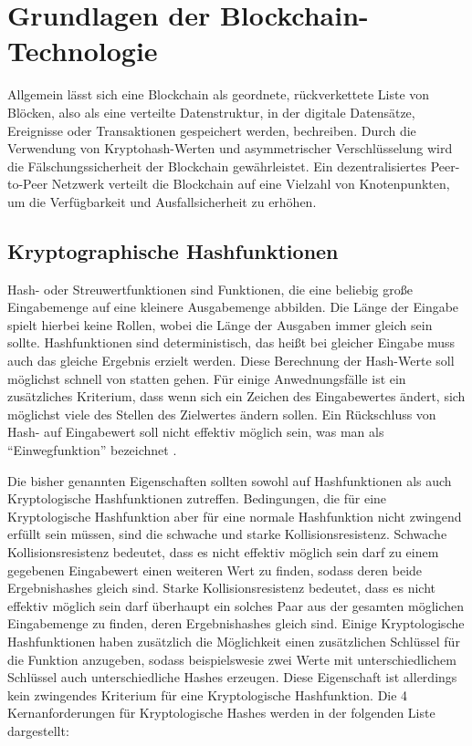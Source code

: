 \chapter{\label{chap:2grundlagen}Grundlagen der Blockchain-Technologie}

Allgemein lässt sich eine Blockchain als geordnete, rückverkettete Liste von Blöcken, also als eine verteilte Datenstruktur\citep{Block}, in der digitale Datensätze, Ereignisse oder Transaktionen gespeichert werden, bechreiben. 
Durch die Verwendung von Kryptohash-Werten und asymmetrischer Verschlüsselung wird die Fälschungssicherheit der Blockchain gewährleistet. Ein dezentralisiertes Peer-to-Peer Netzwerk verteilt die Blockchain auf eine Vielzahl von Knotenpunkten, um die Verfügbarkeit und Ausfallsicherheit zu erhöhen\citep{bafin}. 

	\section{Kryptographische Hashfunktionen}
		
		Hash- oder Streuwertfunktionen sind Funktionen, die eine beliebig große Eingabemenge auf eine kleinere Ausgabemenge abbilden. Die Länge der Eingabe spielt hierbei keine Rollen, wobei die Länge der Ausgaben immer gleich sein sollte. Hashfunktionen sind deterministisch, das heißt bei gleicher Eingabe muss auch das gleiche Ergebnis erzielt werden. Diese Berechnung der Hash-Werte soll möglichst schnell von statten gehen. Für einige Anwednungsfälle ist ein zusätzliches Kriterium, dass wenn sich ein Zeichen des Eingabewertes ändert, sich möglichst viele des Stellen des Zielwertes ändern sollen. Ein Rückschluss von Hash- auf Eingabewert soll nicht effektiv möglich sein, was man als "`Einwegfunktion"' bezeichnet \citep{kh}.
		
		Die bisher genannten Eigenschaften sollten sowohl auf Hashfunktionen als auch Kryptologische Hashfunktionen zutreffen. Bedingungen, die für eine Kryptologische Hashfunktion aber für eine normale Hashfunktion nicht zwingend erfüllt sein müssen, sind die schwache und starke Kollisionsresistenz. Schwache Kollisionsresistenz bedeutet, dass es nicht effektiv möglich sein darf zu einem gegebenen Eingabewert einen weiteren Wert zu finden, sodass deren beide Ergebnishashes gleich sind. Starke Kollisionsresistenz bedeutet, dass es nicht effektiv möglich sein darf überhaupt ein solches Paar aus der gesamten möglichen Eingabemenge zu finden, deren Ergebnishashes gleich sind. Einige Kryptologische Hashfunktionen haben zusätzlich die Möglichkeit einen zusätzlichen Schlüssel für die Funktion anzugeben, sodass beispielswesie zwei Werte mit unterschiedlichem Schlüssel auch unterschiedliche Hashes erzeugen. Diese Eigenschaft ist allerdings kein zwingendes Kriterium für eine Kryptologische Hashfunktion. Die 4 Kernanforderungen für Kryptologische Hashes werden in der folgenden Liste dargestellt: 
		\newpage
		
